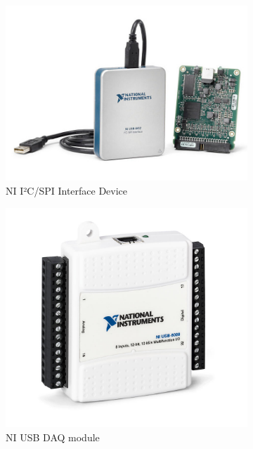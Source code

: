\begin{figure}[h]
	\centering
	\begin{subfigure}{.5\textwidth}
		\centering
		\includegraphics[width=.95\linewidth]{img/ni-i2c-device.jpg}
		\caption{NI I²C/SPI Interface Device}
	\end{subfigure}%
	\begin{subfigure}{.5\textwidth}
		\centering
		\includegraphics[width=.95\linewidth]{img/nidaq.jpg}
		\caption{NI USB DAQ module}
	\end{subfigure}
	\begin{subfigure}{.5\textwidth}
		\centering

\end{subfigure}
\end{figure}
